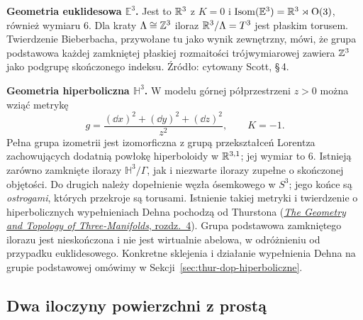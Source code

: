 \textbf{Geometria euklidesowa $\mathbb E^3$.}
Jest to $\mathbb{R}^3$ z $K=0$ i
$\operatorname{Isom}(\mathbb E^3)=\mathbb{R}^3\rtimes\mathrm O(3)$,
również wymiaru $6$. Dla kraty $\Lambda\cong\mathbb{Z}^3$ iloraz
$\mathbb{R}^3/\Lambda=T^3$ jest płaskim torusem. Twierdzenie Bieberbacha,
przywołane tu jako wynik zewnętrzny, mówi, że grupa podstawowa
każdej zamkniętej płaskiej rozmaitości trójwymiarowej zawiera $\mathbb{Z}^3$ jako
podgrupę skończonego indeksu. Źródło: cytowany Scott, \S\,4.

\textbf{Geometria hiperboliczna $\mathbb H^3$.}
W modelu górnej półprzestrzeni $z>0$ można wziąć metrykę
\[
 g=\frac{(\dd x)^2+(\dd y)^2+(\dd z)^2}{z^2},\qquad K=-1.
\]
Pełna grupa izometrii jest izomorficzna z grupą przekształceń
Lorentza zachowujących dodatnią powłokę hiperboloidy
w $\mathbb{R}^{3,1}$; jej wymiar to $6$. Istnieją zarówno zamknięte
ilorazy $\mathbb H^3/\Gamma$, jak i niezwarte ilorazy zupełne
o skończonej objętości. Do drugich należy dopełnienie węzła
ósemkowego w $S^3$; jego końce są \emph{ostrogami}, których
przekroje są torusami. Istnienie takiej metryki i twierdzenie
o hiperbolicznych wypełnieniach Dehna pochodzą od Thurstona
(\href{https://library.slmath.org/nonmsri/gt3m/PDF/Thurston-gt3m.pdf}
{\emph{The Geometry and Topology of Three-Manifolds}, rozdz.\ 4}).
Grupa podstawowa zamkniętego ilorazu jest nieskończona i nie jest
wirtualnie abelowa, w odróżnieniu od przypadku euklidesowego.
Konkretne sklejenia i działanie wypełnienia Dehna na grupie
podstawowej omówimy w Sekcji~\ref{sec:thur-dop-hiperboliczne}.

\subsection*{Dwa iloczyny powierzchni z prostą}

